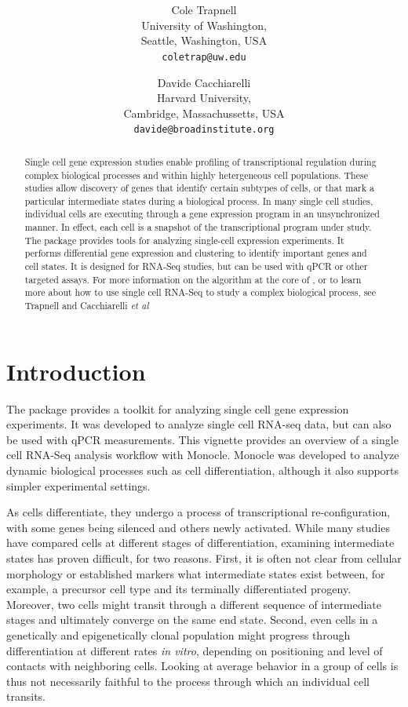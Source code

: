 \documentclass[10pt,oneside]{article}\usepackage[]{graphicx}\usepackage[]{color}
\title{\textsf{\textbf{\thetitle}}}
\author{Cole Trapnell\\[1em]University of Washington,\\ Seattle, Washington, USA\\
\texttt{coletrap@uw.edu} \and
Davide Cacchiarelli\\[1em]Harvard University,\\ Cambridge, Massachussetts, USA\\
\texttt{davide@broadinstitute.org}}
\begin{document}
\maketitle

\begin{abstract}
Single cell gene expression studies enable profiling of transcriptional regulation during complex biological processes and within highly hetergeneous cell populations. These studies allow discovery of genes that identify certain subtypes of cells, or that mark a particular intermediate states during a biological process. In many single cell studies, individual cells are executing through a gene expression program in an unsynchronized manner. In effect, each cell is a snapshot of the transcriptional program under study. The package  provides tools for analyzing single-cell expression experiments. It performs differential gene expression and clustering to identify important genes and cell states. It is designed for RNA-Seq studies, but can be used with qPCR or other targeted assays. For more information on the algorithm at the core of , or to learn more about how to use single cell RNA-Seq to study a complex biological process, see Trapnell and Cacchiarelli \emph{et al}\cite{TRAPNELL_CACCHIARELLI}
\end{abstract}

\tableofcontents



\section{Introduction}

The  package provides a toolkit for analyzing single cell gene expression experiments. It was developed to analyze single cell RNA-seq data, but can also be used with qPCR measurements. This vignette provides an overview of a single cell RNA-Seq analysis workflow with Monocle. Monocle was developed to analyze dynamic biological processes such as cell differentiation, although it also supports simpler experimental settings.

As cells differentiate, they undergo a process of transcriptional re-configuration, with some genes being silenced and others newly activated. While many studies have compared cells at different stages of differentiation, examining intermediate states has proven difficult, for two reasons.  First, it is often not clear from cellular morphology or established markers what intermediate states exist between, for example, a precursor cell type and its terminally differentiated progeny.  Moreover, two cells might transit through a different sequence of intermediate stages and ultimately converge on the same end state.  Second, even cells in a genetically and epigenetically clonal population might progress through differentiation at different rates \emph{in vitro}, depending on positioning and level of contacts with neighboring cells. Looking at average behavior in a group of cells is thus not necessarily faithful to the process through which an individual cell transits.
\end{document}
